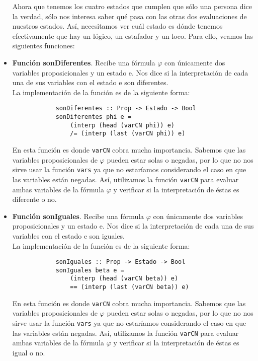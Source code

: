 \documentclass[letterpaper,12pt]{article}
\begin{document}
\begin{itemize}
        Ahora que tenemos los cuatro estados que cumplen que sólo una persona
        dice la verdad, sólo nos interesa saber qué pasa con las otras dos 
        evaluaciones de nuestros estados. Así, necesitamos ver cuál estado 
        es dónde tenemos efectivamente que hay un lógico, un estafador y un
        loco. Para ello, veamos las siguientes funciones:

        \item \textbf{Función sonDiferentes}. Recibe una fórmula $\varphi$ con
        únicamente dos variables proposicionales y un estado e. Nos dice si 
        la interpretación de cada una de sus variables con el estado e son 
        diferentes. \\
        La implementación de la función es de la siguiente forma: 
        \begin{lstlisting}
            sonDiferentes :: Prop -> Estado -> Bool
            sonDiferentes phi e = 
                (interp (head (varCN phi)) e) 
                /= (interp (last (varCN phi)) e)
        \end{lstlisting}

        En esta función es donde \texttt{varCN} cobra mucha importancia. 
        Sabemos que las variables proposicionales de $\varphi$ pueden estar 
        solas o negadas, por lo que no nos sirve usar la función \texttt{vars}
        ya que no estaríamos considerando el caso en que las variables están 
        negadas. Así, utilizamos la función \texttt{varCN} para evaluar ambas 
        variables de la fórmula $\varphi$ y verificar si la interpretación de 
        éstas es diferente o no.

        \item \textbf{Función sonIguales}. Recibe una fórmula $\varphi$ con 
        únicamente dos variables proposicionales y un estado e. Nos dice si 
        la interpretación de cada una de sus variables con el estado e son 
        iguales. \\
        La implementación de la función es de la siguiente forma:
        \begin{lstlisting}
            sonIguales :: Prop -> Estado -> Bool
            sonIguales beta e = 
                (interp (head (varCN beta)) e) 
                == (interp (last (varCN beta)) e)
        \end{lstlisting}

        En esta función es donde \texttt{varCN} cobra mucha importancia. 
        Sabemos que las variables proposicionales de $\varphi$ pueden estar 
        solas o negadas, por lo que no nos sirve usar la función \texttt{vars}
        ya que no estaríamos considerando el caso en que las variables están 
        negadas. Así, utilizamos la función \texttt{varCN} para evaluar ambas 
        variables de la fórmula $\varphi$ y verificar si la interpretación de 
        éstas es igual o no.


\end{itemize}
\end{document}
